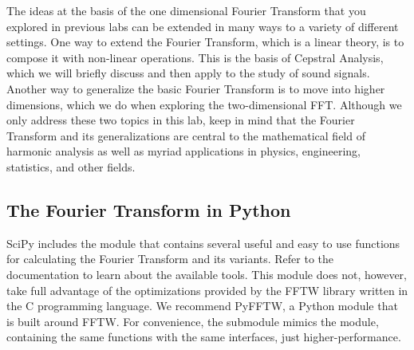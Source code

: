 
The ideas at the basis of the one dimensional Fourier Transform that you explored in previous labs can be
extended in many ways to a variety of different settings. One way to extend the Fourier Transform, which is
a linear theory, is to compose it with non-linear operations. This is the basis of Cepstral Analysis, which we
will briefly discuss and then apply to the study of sound signals. Another way to generalize the basic
Fourier Transform is to move into higher dimensions, which we do when exploring the two-dimensional FFT.
Although we only address these two topics in this lab, keep in mind that the Fourier Transform and its
generalizations are central to the mathematical field of harmonic analysis as well as myriad applications
in physics, engineering, statistics, and other fields.

\subsection*{The Fourier Transform in Python}
SciPy includes the module  that contains several useful and easy to use functions
for calculating the Fourier Transform and its variants. Refer to the documentation to learn about
the available tools. This module does not, however, take full advantage of the optimizations provided
by the FFTW library written in the C programming language. We recommend PyFFTW, a Python module that
is built around FFTW. For convenience, the submodule  mimics the
 module, containing the same functions with the same interfaces, just higher-performance.

